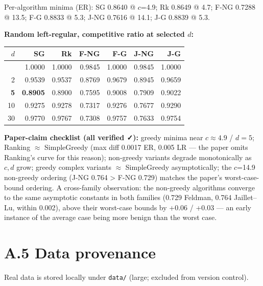 Per-algorithm minima (ER): SG 0.8640 @ \(c\)=4.9; Rk 0.8649 @ 4.7; F-NG 0.7288 @ 13.5;
F-G 0.8833 @ 5.3; J-NG 0.7616 @ 14.1; J-G 0.8839 @ 5.3.

\textbf{Random left-regular, competitive ratio at selected \(d\):}

{\def\LTcaptype{none} %
\begin{longtable}[]{@{}rrrrrrr@{}}
\toprule\noalign{}
\(d\) & SG & Rk & F-NG & F-G & J-NG & J-G \\
\midrule\noalign{}
\endhead
\bottomrule\noalign{}
\endlastfoot
1 & 1.0000 & 1.0000 & 0.9845 & 1.0000 & 0.9845 & 1.0000 \\
2 & 0.9539 & 0.9537 & 0.8769 & 0.9679 & 0.8945 & 0.9659 \\
\textbf{5} & \textbf{0.8905} & 0.8900 & 0.7595 & 0.9008 & 0.7909 & 0.9022 \\
10 & 0.9275 & 0.9278 & 0.7317 & 0.9276 & 0.7677 & 0.9290 \\
30 & 0.9770 & 0.9767 & 0.7308 & 0.9757 & 0.7633 & 0.9754 \\
\end{longtable}
}

\textbf{Paper-claim checklist (all verified ✓):} greedy minima near \(c\approx4.9\) / \(d=5\);
Ranking \(\approx\) SimpleGreedy (max diff 0.0017 ER, 0.005 LR --- the paper omits Ranking's
curve for this reason); non-greedy variants degrade monotonically as \(c,d\) grow; greedy
complex variants \(\approx\) SimpleGreedy asymptotically; the \(c\)=14.9 non-greedy ordering
(J-NG 0.764 \textgreater{} F-NG 0.729) matches the paper's worst-case-bound ordering. A cross-family
observation: the non-greedy algorithms converge to the same asymptotic constants in both
families (0.729 Feldman, 0.764 Jaillet--Lu, within 0.002), above their worst-case bounds by
+0.06 / +0.03 --- an early instance of the average case being more benign than the worst case.

\section{A.5 Data provenance}\label{a.5-data-provenance}

Real data is stored locally under \texttt{data/} (large; excluded from version control).

